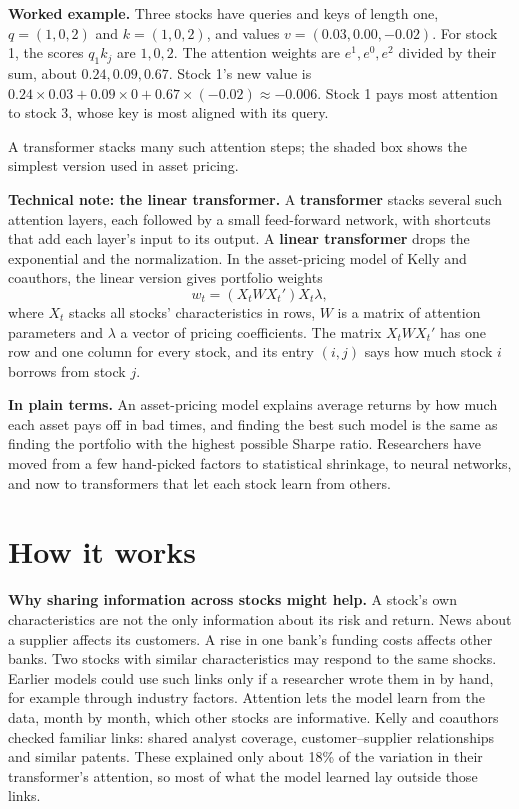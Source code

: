 \textbf{Worked example.} Three stocks have queries and keys of length one, $q = (1, 0, 2)$ and $k = (1, 0, 2)$, and values $v = (0.03, 0.00, -0.02)$. For stock 1, the scores $q_1 k_j$ are $1, 0, 2$. The attention weights are $e^1, e^0, e^2$ divided by their sum, about $0.24, 0.09, 0.67$. Stock 1's new value is $0.24 \times 0.03 + 0.09 \times 0 + 0.67 \times (-0.02) \approx -0.006$. Stock 1 pays most attention to stock 3, whose key is most aligned with its query.

A transformer stacks many such attention steps; the shaded box shows the simplest version used in asset pricing.

\begin{technote}
\textbf{Technical note: the linear transformer.} A \textbf{transformer} stacks several such attention layers, each followed by a small feed-forward network, with shortcuts that add each layer's input to its output. A \textbf{linear transformer} drops the exponential and the normalization. In the asset-pricing model of Kelly and coauthors, the linear version gives portfolio weights
\begin{equation}
  w_t = \left(X_t W X_t'\right) X_t \lambda,
  \label{eq:22-linear}
\end{equation}
where $X_t$ stacks all stocks' characteristics in rows, $W$ is a matrix of attention parameters and $\lambda$ a vector of pricing coefficients. The matrix $X_t W X_t'$ has one row and one column for every stock, and its entry $(i,j)$ says how much stock $i$ borrows from stock $j$.
\end{technote}

\noindent\textbf{In plain terms.} An asset-pricing model explains average returns by how much each asset pays off in bad times, and finding the best such model is the same as finding the portfolio with the highest possible Sharpe ratio. Researchers have moved from a few hand-picked factors to statistical shrinkage, to neural networks, and now to transformers that let each stock learn from others.

\section{How it works}
\label{sec:22-how}

\textbf{Why sharing information across stocks might help.} A stock's own characteristics are not the only information about its risk and return. News about a supplier affects its customers. A rise in one bank's funding costs affects other banks. Two stocks with similar characteristics may respond to the same shocks. Earlier models could use such links only if a researcher wrote them in by hand, for example through industry factors. Attention lets the model learn from the data, month by month, which other stocks are informative. Kelly and coauthors checked familiar links: shared analyst coverage, customer--supplier relationships and similar patents. These explained only about 18\% of the variation in their transformer's attention, so most of what the model learned lay outside those links.

